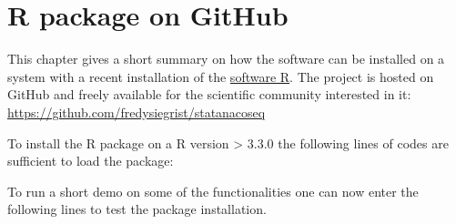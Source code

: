\chapter{R package on GitHub}
This chapter gives a short summary on how the software can be installed on a system with a recent installation of the \href{https://r-project.org}{software R}.
The project is hosted on GitHub and freely available for the scientific community interested in it:
\href{https://github.com/fredysiegrist/statanacoseq}{https://github.com/fredysiegrist/statanacoseq}

To install the R package on a R version > 3.3.0 the following lines of codes are sufficient to load the package:

  

To run a short demo on some of the functionalities one can now enter the following lines to test the package installation.

  